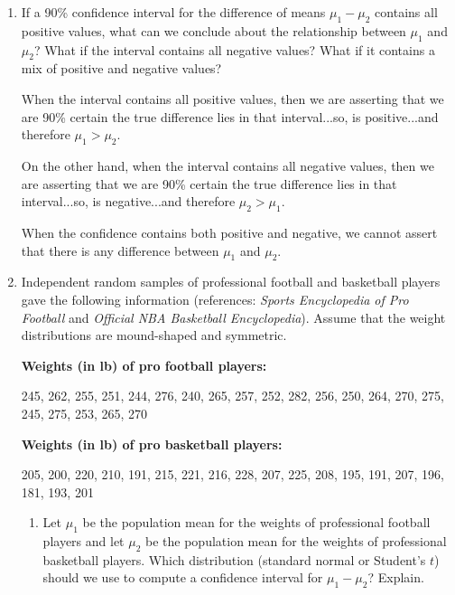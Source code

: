 \documentclass{article}
\newcommand{\answer}[1]{\color{red}#1}
\begin{document}
\pagestyle{myheadings}

\begin{center}
\textbf{}
\end{center}


\begin{enumerate}

\item If a 90\% confidence interval for the difference of means $\mu_1 -\mu_2$ contains all positive values, what can we conclude about the relationship between $\mu_1$ and $\mu_2$? What if the interval contains all negative values? What if it contains a mix of positive and negative values?  

{\answer When the interval contains all positive values, then we are asserting that we are 90\% certain the true difference lies in that interval...so, is positive...and therefore $\mu_1 > \mu_2$.  

On the other hand, when the interval contains all negative values, then we are asserting that we are 90\% certain the true difference lies in that interval...so, is negative...and therefore $\mu_2 > \mu_1$.  

When the confidence contains both positive and negative, we cannot assert that there is any difference between $\mu_1$ and $\mu_2$.
}  

\item Independent random samples of professional football and basketball players gave the following information (references: {\em Sports Encyclopedia of Pro Football} and {\em Official NBA Basketball Encyclopedia}). Assume that the weight distributions are mound-shaped and symmetric.
\begin{center}
\textbf{Weights (in lb) of pro football players:}  

245, 262, 255, 251, 244, 276, 240, 265, 257, 252, 282,  
256, 250, 264, 270, 275, 245, 275, 253, 265, 270  

\medskip

\textbf{Weights (in lb) of pro basketball players:}  

205, 200, 220, 210, 191, 215, 221, 216, 228, 207,  
225, 208, 195, 191, 207, 196, 181, 193, 201
\end{center}

	\begin{enumerate}
	\item Let $\mu_1$ be the population mean for the weights of professional football players and let $\mu_2$ be the population mean for the weights of professional basketball players. Which distribution (standard normal or Student's $t$) should we use to compute a confidence interval for $\mu_1 - \mu_2$? Explain.  
	

\end{enumerate}
\end{enumerate}
\end{document}
